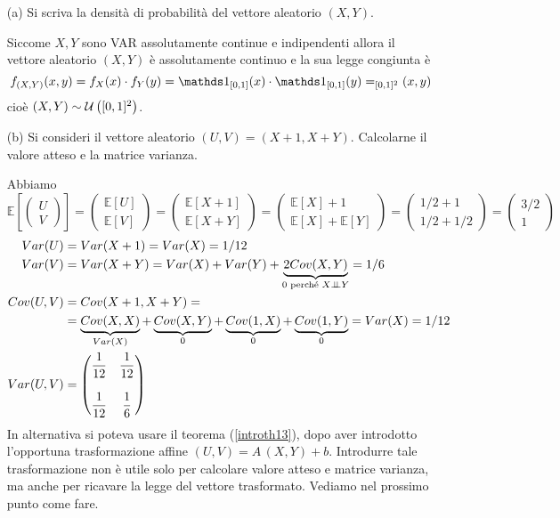 \Soluzione{}
\begin{enumerate}
\item [(a)] Si scriva la densità di probabilità del vettore aleatorio $(X,Y)$.

Siccome $X,Y$ sono VAR assolutamente continue e indipendenti allora il vettore aleatorio $(X,Y)$ è assolutamente continuo e la sua legge congiunta è
\[
\fXYxy=f_X(x)\cdot f_Y(y)=\Ind_{[0,1]}(x)\cdot \Ind_{[0,1]}(y)=_{[0,1]^2}(x,y)
\]
cioè $(X,Y)\sim\mathcal{U}\left([0,1]^2\right)$.

\item [(b)] Si consideri il vettore aleatorio $(U,V)=(X+1,X+Y)$. Calcolarne il valore atteso e la matrice varianza.

Abbiamo
\[
\mathbb{E}\left[\begin{pmatrix}
U \\ V
\end{pmatrix}\right] =
\begin{pmatrix}
\mathbb{E}[U] \\ \mathbb{E}[V]
\end{pmatrix} = 
\begin{pmatrix}
\mathbb{E}[X+1] \\ \mathbb{E}[X+Y]
\end{pmatrix} = 
\begin{pmatrix}
\mathbb{E}[X]+1 \\ \mathbb{E}[X] +\mathbb{E}[Y]
\end{pmatrix} =
\begin{pmatrix}
1/2+1 \\ 1/2+1/2
\end{pmatrix} = 
\begin{pmatrix}
3/2 \\ 1
\end{pmatrix}
\]
\begin{gather*}
\begin{aligned}
Var(U)&=Var(X+1)=Var(X)=1/12 \\
Var(V)&=Var(X+Y)=Var(X)+Var(Y)+\underbrace{2Cov(X,Y)}_{0\text{ perché }X\perp \!\!\! \perp Y}=1/6 \\
Cov(U,V)&=Cov(X+1,X+Y)=\\
&=\underbrace{Cov(X,X)}_{Var(X)}+\underbrace{Cov(X,Y)}_{0}+\underbrace{Cov(1,X)}_{0}+\underbrace{Cov(1,Y)}_{0}=Var(X)=1/12 \\
Var(U,V)&=\begin{pmatrix}
 \dfrac{1}{12}& \dfrac{1}{12} \\
\, & \, \\
\dfrac{1}{12} &\dfrac{1}{6}  \\
\end{pmatrix}  
\end{aligned}
\end{gather*}
In alternativa si poteva usare il teorema (\ref{introth13}), dopo aver introdotto l'opportuna trasformazione affine $(U,V)=A\,(X,Y)+b$. Introdurre tale trasformazione non è utile solo per calcolare valore atteso e matrice varianza, ma anche per ricavare la legge del vettore trasformato. Vediamo nel prossimo punto come fare.


\end{enumerate}
